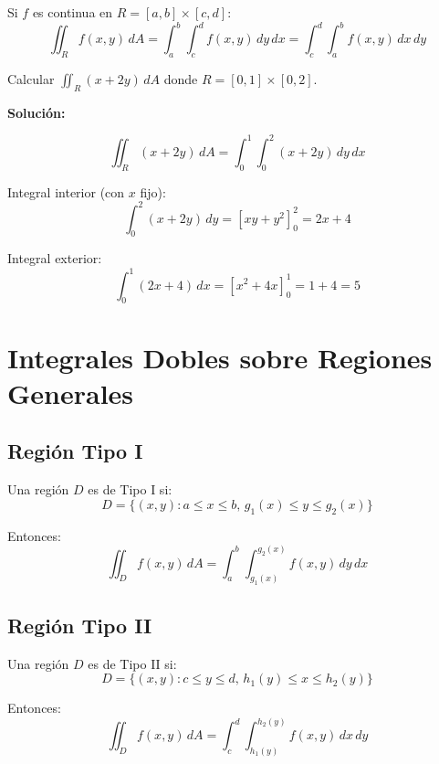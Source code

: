 \documentclass[12pt, a4paper]{book}
\begin{document}
\begin{teorema}
Si $f$ es continua en $R = [a,b] \times [c,d]$:
\[
\iint_R f(x,y) \, dA = \int_a^b \int_c^d f(x,y) \, dy \, dx = \int_c^d \int_a^b f(x,y) \, dx \, dy
\]
\end{teorema}

\begin{ejemplo}
Calcular $\iint_R (x + 2y) \, dA$ donde $R = [0,1] \times [0,2]$.

\textbf{Solución:}

\[
\iint_R (x + 2y) \, dA = \int_0^1 \int_0^2 (x + 2y) \, dy \, dx
\]

Integral interior (con $x$ fijo):
\[
\int_0^2 (x + 2y) \, dy = [xy + y^2]_0^2 = 2x + 4
\]

Integral exterior:
\[
\int_0^1 (2x + 4) \, dx = [x^2 + 4x]_0^1 = 1 + 4 = 5
\]
\end{ejemplo}

\section{Integrales Dobles sobre Regiones Generales}

\subsection{Región Tipo I}

\begin{definicion}
Una región $D$ es de Tipo I si:
\[
D = \{(x,y) : a \leq x \leq b, \, g_1(x) \leq y \leq g_2(x)\}
\]

Entonces:
\[
\iint_D f(x,y) \, dA = \int_a^b \int_{g_1(x)}^{g_2(x)} f(x,y) \, dy \, dx
\]
\end{definicion}

\subsection{Región Tipo II}

\begin{definicion}
Una región $D$ es de Tipo II si:
\[
D = \{(x,y) : c \leq y \leq d, \, h_1(y) \leq x \leq h_2(y)\}
\]

Entonces:
\[
\iint_D f(x,y) \, dA = \int_c^d \int_{h_1(y)}^{h_2(y)} f(x,y) \, dx \, dy
\]
\end{definicion}
\end{document}
